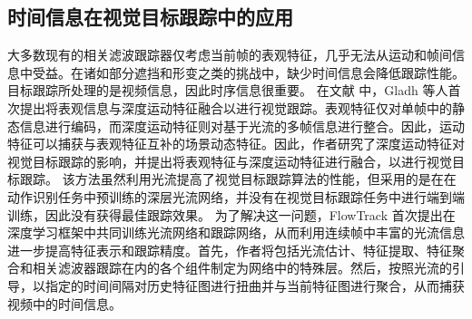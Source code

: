 \subsection{时间信息在视觉目标跟踪中的应用}
大多数现有的相关滤波跟踪器仅考虑当前帧的表观特征，几乎无法从运动和帧间信息中受益。在诸如部分遮挡和形变之类的挑战中，缺少时间信息会降低跟踪性能。目标跟踪所处理的是视频信息，因此时序信息很重要。
在文献 \cite{DeepMotion} 中，Gladh 等人首次提出将表观信息与深度运动特征融合以进行视觉跟踪。表观特征仅对单帧中的静态信息进行编码，而深度运动特征则对基于光流的多帧信息进行整合。因此，运动特征可以捕获与表观特征互补的场景动态特征。因此，作者研究了深度运动特征对视觉目标跟踪的影响，并提出将表观特征与深度运动特征进行融合，以进行视觉目标跟踪。
该方法虽然利用光流提高了视觉目标跟踪算法的性能，但采用的是在在动作识别任务中预训练的深层光流网络，并没有在视觉目标跟踪任务中进行端到端训练，因此没有获得最佳跟踪效果。
为了解决这一问题，FlowTrack \cite{FlowTrack} 首次提出在深度学习框架中共同训练光流网络和跟踪网络，从而利用连续帧中丰富的光流信息进一步提高特征表示和跟踪精度。首先，作者将包括光流估计、特征提取、特征聚合和相关滤波器跟踪在内的各个组件制定为网络中的特殊层。然后，按照光流的引导，以指定的时间间隔对历史特征图进行扭曲并与当前特征图进行聚合，从而捕获视频中的时间信息。

